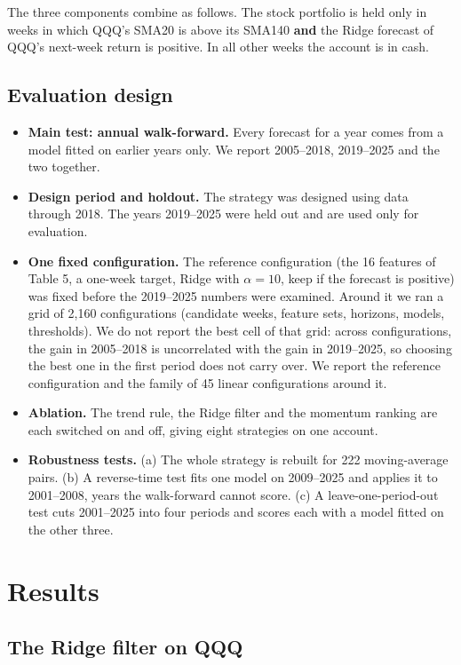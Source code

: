 \documentclass[11pt]{article}
\providecommand{\tightlist}{\setlength{\itemsep}{2pt}\setlength{\parskip}{0pt}}
\begin{document}
The three components combine as follows. The stock portfolio is held only in weeks in which QQQ's SMA20 is above its SMA140 \textbf{and} the Ridge forecast of QQQ's next-week return is positive. In all other weeks the account is in cash.

\subsection{Evaluation design}

\begin{itemize}
\tightlist
\item
  \textbf{Main test: annual walk-forward.} Every forecast for a year comes from a model fitted on earlier years only. We report 2005--2018, 2019--2025 and the two together.
\item
  \textbf{Design period and holdout.} The strategy was designed using data through 2018. The years 2019--2025 were held out and are used only for evaluation.
\item
  \textbf{One fixed configuration.} The reference configuration (the 16 features of Table 5, a one-week target, Ridge with \(\alpha = 10\), keep if the forecast is positive) was fixed before the 2019--2025 numbers were examined. Around it we ran a grid of 2,160 configurations (candidate weeks, feature sets, horizons, models, thresholds). We do not report the best cell of that grid: across configurations, the gain in 2005--2018 is uncorrelated with the gain in 2019--2025, so choosing the best one in the first period does not carry over. We report the reference configuration and the family of 45 linear configurations around it.
\item
  \textbf{Ablation.} The trend rule, the Ridge filter and the momentum ranking are each switched on and off, giving eight strategies on one account.
\item
  \textbf{Robustness tests.} (a) The whole strategy is rebuilt for 222 moving-average pairs. (b) A reverse-time test fits one model on 2009--2025 and applies it to 2001--2008, years the walk-forward cannot score. (c) A leave-one-period-out test cuts 2001--2025 into four periods and scores each with a model fitted on the other three.
\end{itemize}

\section{Results}

\subsection{The Ridge filter on QQQ}
\end{document}
